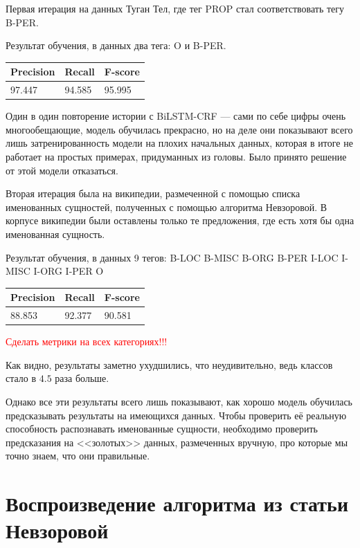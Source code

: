 Первая итерация на данных Туган Тел, где тег PROP стал соответствовать тегу B-PER.

Результат обучения, в данных два тега: O и B-PER.

\medskip

\begin{tabular}{| l | l | l |}
\hline
Precision  &   Recall   &  F-score     \\

\hline
97.447     & 94.585    & 95.995        \\
\hline
\end{tabular}

Один в один повторение истории с BiLSTM-CRF --- сами по себе цифры очень многообещающие, модель обучилась прекрасно, но на деле они показывают всего лишь затренированность модели на плохих начальных данных, которая в итоге не работает на простых примерах, придуманных из головы. Было принято решение от этой модели отказаться.

Вторая итерация была на википедии, размеченной с помощью списка именованных сущностей, полученных с помощью алгоритма Невзоровой. В корпусе википедии были оставлены только те предложения, где есть хотя бы одна именованная сущность.

Результат обучения, в данных 9 тегов:
B-LOC
B-MISC
B-ORG
B-PER
I-LOC
I-MISC
I-ORG
I-PER
O

\begin{tabular}{| l | l | l |}
\hline
Precision  &   Recall   &  F-score     \\

\hline
88.853    & 92.377    & 90.581        \\
\hline
\end{tabular}
 
 \textcolor{red}{Сделать метрики на всех категориях!!!}

Как видно, результаты заметно ухудшились, что неудивительно, ведь классов стало в $4.5$ раза больше.

Однако все эти результаты всего лишь показывают, как хорошо модель обучилась предсказывать результаты на имеющихся данных. Чтобы проверить её реальную способность распознавать именованные сущности, необходимо проверить предсказания на <<золотых>> данных, размеченных вручную, про которые мы точно знаем, что они правильные.


\section{Воспроизведение алгоритма из статьи Невзоровой}


